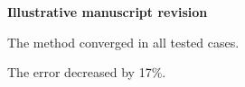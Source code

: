 \documentclass[12pt]{article}
\begin{document}
\noindent\textbf{Illustrative manuscript revision}

\noindent The method converged in all tested cases.

\noindent The error decreased by 17\%.
\end{document}
